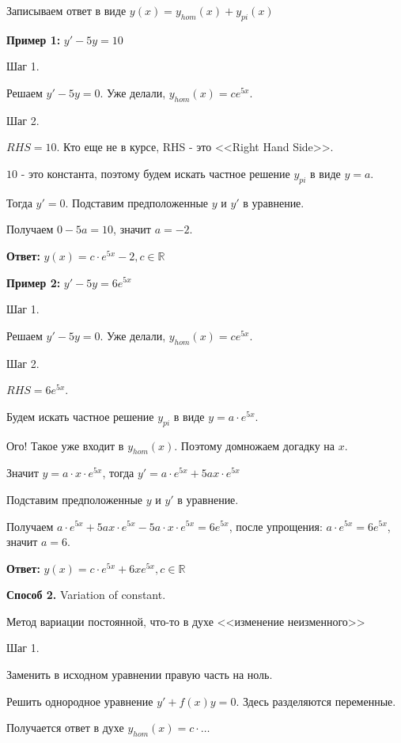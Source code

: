 \documentclass[10pt,a4paper]{article}
\begin{document}
\par Записываем ответ в виде $y(x) = y_{hom}(x) + y_{pi}(x)$
\par \textbf{Пример 1:} $y' - 5y = 10$
\par Шаг 1.
\par Решаем $y' - 5y = 0$. Уже делали, $y_{hom}(x) = ce^{5x}$.
\par Шаг 2.
\par $RHS = 10.$ Кто еще не в курсе, RHS - это <<Right Hand Side>>.
\par $10$ - это константа, поэтому будем искать частное решение $y_{pi}$ в виде $y = a$. 
\par Тогда $y' = 0$. Подставим предположенные $y$ и $y'$ в уравнение.
\par Получаем $0 - 5a  = 10$, значит $a = -2.$ 
\par \textbf{Ответ:} $y(x) = c \cdot e^{5x} - 2, c \in \mathbb{R}$
\par \textbf{Пример 2:} $y' - 5y = 6e^{5x}$
\par Шаг 1.
\par Решаем $y' - 5y = 0$. Уже делали, $y_{hom}(x) = ce^{5x}$.
\par Шаг 2.
\par $RHS = 6e^{5x}.$ 
\par Будем искать частное решение $y_{pi}$ в виде $y = a \cdot e^{5x}$. 
\par Ого! Такое уже входит в $y_{hom}(x)$. Поэтому домножаем догадку на $x$.
\par Значит $y = a \cdot x \cdot e^{5x}$, тогда $y' = a \cdot e^{5x} + 5ax \cdot e^{5x}$
\par Подставим предположенные $y$ и $y'$ в уравнение.
\par Получаем $a \cdot e^{5x} + 5ax \cdot e^{5x} - 5a \cdot x \cdot e^{5x}  = 6e^{5x}$, после упрощения: $a \cdot e^{5x} = 6e^{5x}$, значит $a = 6.$ 
\par \textbf{Ответ:} $y(x) = c \cdot e^{5x} + 6x e^{5x}, c \in \mathbb{R}$
\par \textbf{Способ 2.} Variation of constant.
\par Метод вариации постоянной, что-то в духе <<изменение неизменного>> 
\par Шаг 1.
\par Заменить в исходном уравнении правую часть на ноль.
\par Решить однородное уравнение $y' + f(x) y = 0$. Здесь разделяются переменные.
\par Получается ответ в духе $y_{hom}(x) = c \cdot \dots$
\end{document}
